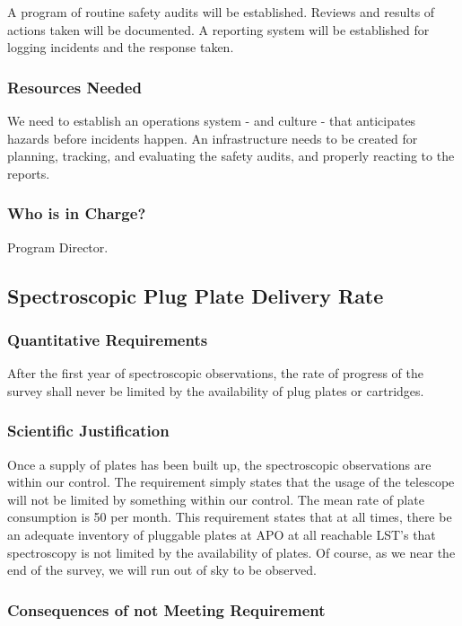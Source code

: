 A program of routine safety audits will be established.  Reviews and results 
of actions taken will be documented.  A reporting system will be 
established for logging incidents and the response taken. 

\subsubsection{Resources Needed} 

We need to establish an operations system - and culture - that anticipates 
hazards before incidents happen.  An infrastructure needs to be created for 
planning, tracking, and evaluating the safety audits, and properly reacting 
to the reports. 

\subsubsection{Who is in Charge?}

Program Director. 

\subsection{Spectroscopic Plug Plate Delivery Rate}

\subsubsection{Quantitative Requirements}

After the first year of spectroscopic observations, the rate of progress of 
the survey shall never be limited by the availability of plug plates or 
cartridges.  

\subsubsection{Scientific Justification}

Once a supply of plates has been built up, the spectroscopic
observations are within our control.  The requirement simply states
that the usage of the telescope will not be limited by something
within our control.  The mean rate of plate consumption is 50 per
month.  This requirement states that at all times, there be an
adequate inventory of pluggable plates at APO at all reachable LST's
that spectroscopy is not limited by the availability of plates.  Of
course, as we near the end of the survey, we will run out of sky to be
observed.

\subsubsection{Consequences of not Meeting Requirement}

